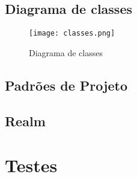 \subsection{Diagrama de classes}

\begin{figure}[h]
\centering
\texttt{[image: classes.png]}
\caption{Diagrama de classes}
\end{figure}

\subsection{Padrões de Projeto}

\subsection{Realm}


\section{Testes}